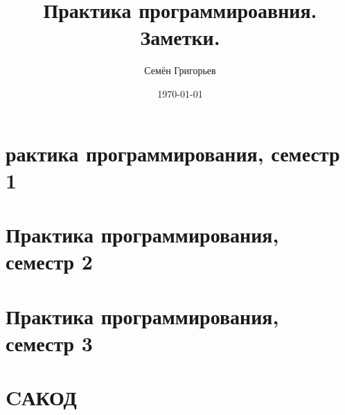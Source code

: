 \documentclass[12pt, a4paper]{book}
\title{Практика программироавния. Заметки.}
\author{Семён Григорьев}
\date{\today}
\theoremstyle{definition}
\theoremstyle{remark}
\begin{document}
\maketitle
\newpage
\tableofcontents
\newpage

%

\chapter{рактика программирования, семестр 1}









































\chapter{Практика программирования, семестр 2}















\chapter{Практика программирования, семестр 3}

\chapter{CАКОД}







\end{document}
